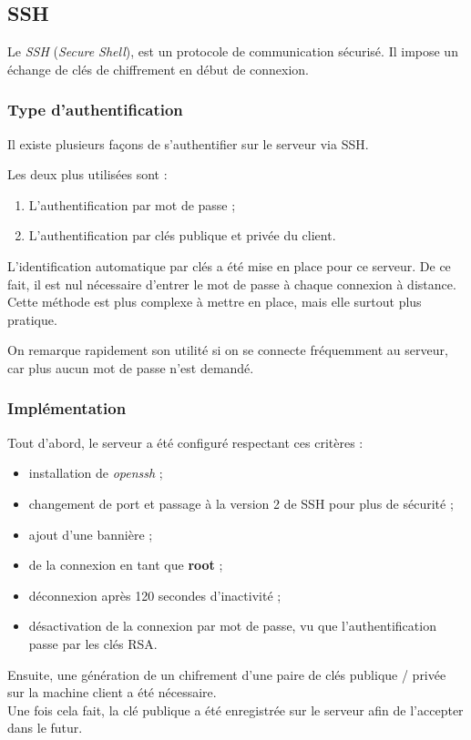 \subsection{SSH}
\label{subsec:ssh}

Le \emph{SSH} (\emph{Secure Shell}), est un protocole de communication
sécurisé. Il impose un échange de clés de chiffrement en début de connexion.

\subsubsection{Type d'authentification}
\label{subsubsec:type-authentification}

Il existe plusieurs façons de s'authentifier sur le serveur via SSH.

Les deux plus utilisées sont :

\begin{enumerate}
\item L'authentification par mot de passe ;
\item L'authentification par clés publique et privée du client.
\end{enumerate}

L'identification automatique par clés a été mise en place pour ce serveur. De ce
fait, il est nul nécessaire d'entrer le mot de passe à chaque connexion à
distance. \\ Cette méthode est plus complexe à mettre en place, mais elle
surtout plus pratique.

On remarque rapidement son utilité si on se connecte fréquemment au serveur, car
plus aucun mot de passe n'est demandé.

\subsubsection{Implémentation}
\label{subsubsec:implementation}

Tout d'abord, le serveur a été configuré respectant ces critères :

\begin{itemize}
    \item installation de \textit{openssh} ;
    \item changement de port et passage à la version 2 de SSH pour plus de
    sécurité ;
    \item ajout d'une bannière ;
    \item de la connexion en tant que \textbf{root} ;
    \item déconnexion après 120 secondes d'inactivité ;
    \item désactivation de la connexion par mot de passe, vu que l'authentification
    passe par les clés RSA.
\end{itemize}

Ensuite, une génération de un chifrement d'une paire de clés publique / privée
sur la machine client a été nécessaire. \\ Une fois cela fait, la clé publique a
été enregistrée sur le serveur afin de l'accepter dans le futur.


